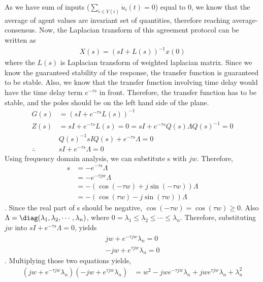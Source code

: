 \documentclass{article}
\begin{document}
\begin{problem}
    As we have sum of inputs ($\sum_{i \in V(i)} \dot u_i(t) = 0$) equal to 0, we know that the average of agent values are invariant set of quantities, therefore reaching average-consensus. Now, the Laplacian transform of this agreement protocol can be written as
    \begin{align*}
        X(s) = (sI + L(s))^{-1} x(0)
    \end{align*}
    where the $L(s)$ is Laplacian transform of weighted laplacian matrix. Since we know the guaranteed stability of the response, the transfer function is guaranteed to be stable. Also, we know that the transfer function involving time delay would have the time delay term $e^{-\tau s}$ in front. Therefore, the transfer function has to be stable, and the poles should be on the left hand side of the plane.
    \begin{align*}
        G(s) &= (sI + e^{-\tau s} L(s))^{-1}\\
        Z(s) &= sI + e^{-\tau s} L(s) = 0 = sI + e^{-\tau s} Q(s) \Lambda Q(s)^{-1} = 0\\
        &Q(s)^{-1} sI Q(s)+ e^{-\tau s} \Lambda = 0\\
        \therefore &sI + e^{-\tau s} \Lambda  = 0
    \end{align*}
    Using frequency domain analysis, we can substitute s with $jw$. Therefore, 
    \begin{align*}
        s & = - e^{-\tau s} \Lambda \\
        &= -  e^{-\tau jw} \Lambda \\
        &= - (\cos{(-\tau w)}+ j\sin{(-\tau w)})\Lambda \\
        &= -(\cos{(\tau w)}- j \sin{(\tau w)})\Lambda 
    \end{align*}.
    Since the real part of s should be negative, $\cos{(-\tau w)}=\cos{(\tau w)} \geq 0$. Also $\Lambda = \diag (\lambda_1, \lambda_2, \cdots, \lambda_n)$, where $0= \lambda_1 \leq \lambda_2 \leq \cdots \leq \lambda_n$. Therefore, substituting $jw$ into $sI + e^{-\tau s} \Lambda  = 0$, yields 
    \begin{align*}
        jw + e^{-\tau jw} \lambda_n= 0\\
        -jw + e^{\tau jw} \lambda_n= 0
    \end{align*}.
    Multiplying those two equations yields,
    \begin{align*}
        (jw + e^{-\tau jw} \lambda_n)(-jw + e^{\tau jw} \lambda_n) &= w^2 - jwe^{-\tau jw} \lambda_n + jw e^{\tau jw} \lambda_n + \lambda_n^2\\

\end{align*}
\end{problem}
\end{document}
